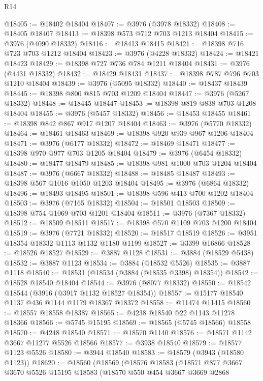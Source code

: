 \begin{lexlean}{R14}
\begin{coremodule}
@18405 := @18402 @18404
@18407 := @3976 (@3978 @18332)
@18408 := @18405 @18407
@18413 := @18398 @573 @712 @703 @1213 @18404
@18415 := @3976 (@4090 @18332)
@18416 := @18413 @18415
@18421 := @18398 @716 @723 @703 @1212 @18404
@18423 := @3976 (@4228 @18332)
@18424 := @18421 @18423
@18429 := @18398 @727 @736 @784 @1211 @18404
@18431 := @3976 (@4431 @18332)
@18432 := @18429 @18431
@18437 := @18398 @787 @796 @703 @1210 @18404
@18439 := @3976 (@5095 @18332)
@18440 := @18437 @18439
@18445 := @18398 @800 @815 @703 @1209 @18404
@18447 := @3976 (@5267 @18332)
@18448 := @18445 @18447
@18453 := @18398 @819 @838 @703 @1208 @18404
@18455 := @3976 (@5457 @18332)
@18456 := @18453 @18455
@18461 := @18398 @842 @867 @917 @1207 @18404
@18463 := @3976 (@5770 @18332)
@18464 := @18461 @18463
@18469 := @18398 @920 @939 @967 @1206 @18404
@18471 := @3976 (@6177 @18332)
@18472 := @18469 @18471
@18477 := @18398 @970 @977 @703 @1205 @18404
@18479 := @3976 (@6454 @18332)
@18480 := @18477 @18479
@18485 := @18398 @981 @1000 @703 @1204 @18404
@18487 := @3976 (@6667 @18332)
@18488 := @18485 @18487
@18493 := @18398 @567 @1016 @1050 @1203 @18404
@18495 := @3976 (@6864 @18332)
@18496 := @18493 @18495
@18501 := @18398 @596 @413 @700 @1202 @18404
@18503 := @3976 (@7165 @18332)
@18504 := @18501 @18503
@18509 := @18398 @754 @1069 @703 @1201 @18404
@18511 := @3976 (@7367 @18332)
@18512 := @18509 @18511
@18517 := @18398 @570 @1109 @703 @1200 @18404
@18519 := @3976 (@7721 @18332)
@18520 := @18517 @18519
@18526 := @3951 @18354 @18332 @1113 @1132 @1180 @1199
@18527 := @3399 @16866
@18528 := @18526 @18527
@18529 := @3887 @1128
@18531 := @3884 (@18529 @5438)
@18532 := @3887 @1123
@18534 := @3884 (@18532 @5526)
@18535 := @3887 @1118
@18540 := @18531 (@18534 (@3884 (@18535 @3398) @18354))
@18542 := @18528 @18540 @18404
@18544 := @3976 (@8077 @18332)
@18550 := @18542 @18544 (@3916 (@3917 @1132 @18527 @18354))
@18557 := @15177 @18540 @1137 @436 @1144 @1179 @18367 @18372
@18558 := @11474 @11415
@18560 := @18557 @18558 @18387
@18565 := @4238 @18540 @22 @1143 @11278 @18366
@18566 := @5745 @15195
@18569 := @18565 (@5745 @18566) @18558
@18570 := @4248 @18540
@18571 := @18570 @1140
@18576 := @18571 @1142 @3667 @11277 @5526 @18566
@18577 := @3938 @18540
@18579 := @18577 @1123 @5526
@18580 := @3944 @18540
@18583 := @18579 (@3943 (@18580 @1123))
@18620 := @18560
    (@18569
      (@18576
        @18583
        (@18571
          @877
          @3667
          @3670
          @5526
          @15195
          @18583
          (@18570
            @550
            @454
            @3667
            @3669
            @2868

\end{coremodule}
\end{lexlean}
